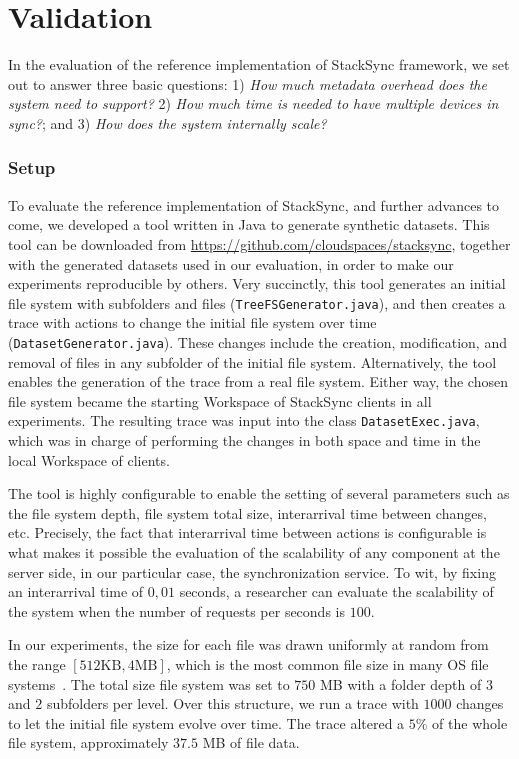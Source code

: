 \chapter{Validation}

In the evaluation of the reference implementation of StackSync framework, we set out to answer three basic questions: 
1) \textit{How much metadata overhead does the system need to support?} 2) \textit{How much time is needed to have multiple devices in sync?}; and 
3) \textit{How does the system internally scale?}

\subsection{Setup}

To evaluate the reference implementation of StackSync, and further advances to come, we developed a tool written in Java to generate synthetic datasets. This tool can be downloaded from \url{https://github.com/cloudspaces/stacksync}, together with the generated datasets used in our evaluation, in order to make our experiments reproducible by others. Very succinctly, this tool generates an initial file system with subfolders and files (\texttt{TreeFSGenerator.java}), and then creates a trace with actions to change the initial file system over time (\texttt{DatasetGenerator.java}). These changes include the creation, modification, and removal of files in any subfolder of the initial file system. Alternatively, the tool enables the generation of the trace from a real file system. Either way, the chosen file system became the starting Workspace of StackSync clients in all experiments. The resulting trace was input into the class \texttt{DatasetExec.java}, which was in charge of performing the changes in both space and time in the local Workspace of clients.

The tool is highly configurable to enable the setting of several parameters such as the file system depth, file system total size, interarrival time between changes, etc. Precisely, the fact that interarrival time between actions is configurable is what makes it possible the evaluation of the scalability of any component at the server side, in our particular case, the synchronization service. To wit, by fixing an interarrival time of $0,01$ seconds, a researcher can evaluate the scalability of the system when the number of requests per seconds is $100$.

In our experiments, the size for each file was drawn uniformly at random from the range $[512 \mathrm{KB}, 4 \mathrm{MB}]$, which is the most common file size in many OS file systems~\cite{Agrawal07}. The total size file system was set to $750$ MB with a folder depth of $3$ and $2$ subfolders per level. Over this structure, we run a trace with $1000$ changes to let the initial file system evolve over time. The trace altered a $5\%$ of the whole file system, approximately $37.5$ MB of file data. 

